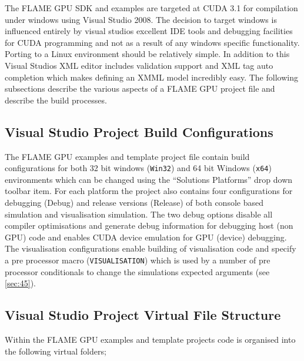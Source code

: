 \documentclass[11pt, a4paper, onecolumn, oneside]{report}
\begin{document}
The FLAME GPU SDK and examples are targeted at CUDA 3.1 for compilation under windows using Visual Studio 2008.
The decision to target windows is influenced entirely by visual studios excellent IDE tools and debugging facilities for CUDA programming and not as a result of any windows specific functionality.
Porting to a Linux environment should be relatively simple.
In addition to this Visual Studios XML editor includes validation support and XML tag auto completion which makes defining an XMML model incredibly easy.
The following subsections describe the various aspects of a FLAME GPU project file and describe the build processes.

\subsection{Visual Studio Project Build Configurations}
\label{sec:441}


The FLAME GPU examples and template project file contain build configurations for both 32 bit windows (\texttt{Win32}) and 64 bit Windows (\texttt{x64}) environments which can be changed using the ``Solutions Platforms'' drop down toolbar item.
For each platform the project also contains four configurations for debugging (Debug) and release versions (Release) of both console based simulation and visualisation simulation.
The two debug options disable all compiler optimisations and generate debug information for debugging host (non GPU) code and enables CUDA device emulation for GPU (device) debugging.
The visualisation configurations enable building of visualisation code and specify a pre processor macro (\texttt{VISUALISATION}) which is used by a number of pre processor conditionals to change the simulations expected arguments (see \cref{sec:45}).

\subsection{Visual Studio Project Virtual File Structure}
\label{sec:442}


Within the FLAME GPU examples and template projects code is organised into the following virtual folders; 
\end{document}
